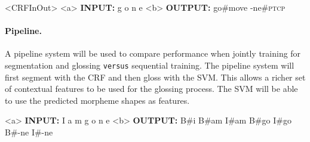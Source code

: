 \begin{singlespace}
\pex<CRFInOut>   
\label{ex:TransInOut}
\a<a> \textbf{INPUT:} \hspace{6 mm} g \hspace{2 mm} o \hspace{2 mm} n \hspace{2 mm} e 
\label{ex:Transin}
\a<b> \textbf{OUTPUT:} \hspace{3 mm} go\#move \hspace{1 mm} -ne\#\textsc{ptcp} 
\label{ex:TransOut}
\xe
\end{singlespace}

\paragraph{Pipeline.}
A pipeline system will be used to compare performance when jointly training for segmentation and glossing {\tt versus} sequential training. 
The pipeline system will first segment with the CRF and then gloss with the SVM. This allows a richer set of contextual features to be used for the glossing process. The SVM will be able to use the predicted morpheme shapes as features.   

\begin{singlespace}
\label{ex:CRF2InOut}
\a<a> \textbf{INPUT:} \hspace{8 mm} I \hspace{8 mm} a \hspace{9 mm} m \hspace{8 mm} g \hspace{8 mm} o \hspace{8 mm} n \hspace{10 mm} e 
\label{ex:CRF2in}
\a<b> \textbf{OUTPUT:} \hspace{2 mm} B\#i \hspace{1 mm} B\#am \hspace{1 mm} I\#am \hspace{1 mm} B\#go \hspace{1 mm} I\#go \hspace{1 mm} B\#-ne \hspace{1 mm} I\#-ne
\label{ex:CRF2Out}
\xe
\end{singlespace}

